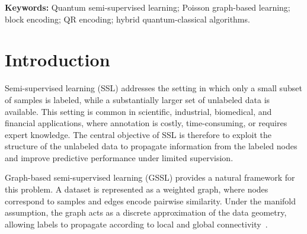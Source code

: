 \documentclass[11pt,a4paper]{article}
\begin{document}
\begin{abstract}
We introduce \textsc{IPQSSL}, a quantum-informed regularized Poisson
framework for graph-based semi-supervised classification under scarce
labels. Local graph-feature contexts are QR-factorized, lifted to unitary
encodings, and processed by a shared variational circuit whose measurements
yield node-wise diagonal weights that stabilize a symmetrized Poisson
system. We establish positive definiteness of the symmetrized regularized
operator under explicit spectral conditions and derive a Hermitian,
block-encoding-compatible formulation, separating the classical
NISQ-oriented implementation from a future fault-tolerant pathway. Across
seven benchmarks spanning tabular data and a citation network, the effect
of regularization is dataset- and budget-dependent: it yields consistent
gains on Wine at every budget and budget-dependent crossovers on Optdigits
and Breast Cancer, with Optdigits reaching $0.946$ accuracy at ten labels
per class while remaining limited on heterogeneous tabular data such as
Heart Disease and German Credit. Ablations attribute the gains to diagonal
stabilization rather than variational training. The result is a
resource-transparent bridge between Poisson graph learning and quantum
linear algebra, with an explicit empirical delineation of when diagonal
regularization helps.

\end{abstract}
\noindent\textbf{Keywords:} Quantum semi-supervised learning; Poisson graph-based learning; block encoding; QR encoding;
hybrid quantum-classical algorithms.




\section{Introduction}\label{sec:introduction}

 Semi-supervised learning (SSL) addresses the setting in which only a small subset of samples is labeled, while a substantially larger set of unlabeled data is available. This setting is common in scientific, industrial, biomedical, and financial applications, where annotation is costly, time-consuming, or requires expert knowledge. The central objective of SSL is therefore to exploit the structure of the unlabeled data to propagate information from the labeled nodes and improve predictive performance under limited supervision.~\cite{zhu2003semi}

Graph-based semi-supervised learning (GSSL) provides a natural framework for this problem. A dataset is represented as a weighted graph, where nodes correspond to samples and edges encode pairwise similarity. Under the manifold assumption, the graph acts as a discrete approximation of the data geometry, allowing labels to propagate according to local and global connectivity~\cite{yang2013saliency}.
\end{document}
